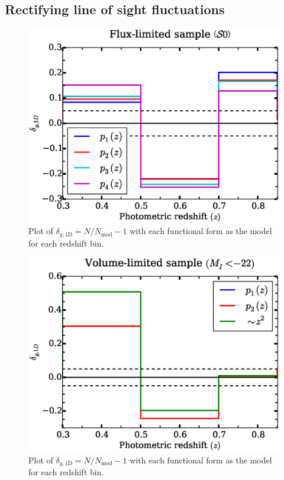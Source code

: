 \documentclass[twocolumn,useAMS,usenatbib]{mn2e}
\begin{document}
\subsection{Rectifying line of sight fluctuations}

\begin{figure}
 \centering
 \includegraphics[width=1.0\columnwidth]{redshift_fluxlimited_wide}
 \caption{Plot of $\delta_{g,\text{1D}} =  N/N_{\text{mod}}-1$ with each functional form as the model
           for each redshift bin. }
 \label{fig:redshift_fluxlimited_wide}          
\end{figure}
\begin{figure}
 \centering
 \includegraphics[width=1.0\columnwidth]{redshift_vollimited_wide}
 \caption{Plot of $\delta_{g,\text{1D}} =  N/N_{\text{mod}}-1$ with each functional form as the model
           for each redshift bin. }
 \label{fig:redshift_vollimited_wide}          
\end{figure}
\end{document}
